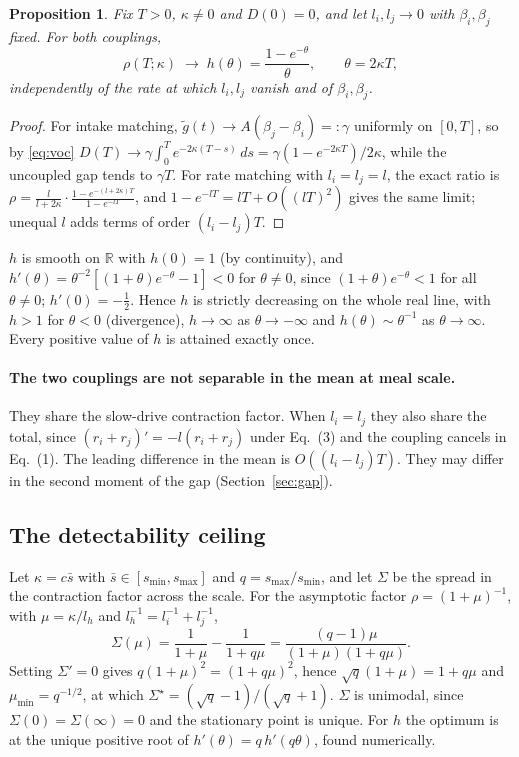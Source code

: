 \documentclass[12pt]{article}
\newtheorem{proposition}{Proposition}[section]
\theoremstyle{definition}
\newcommand{\gt}{\tilde{g}}
\begin{document}
\begin{proposition}\label{prop:flat}
Fix $T>0$, $\kappa\neq0$ and $D(0)=0$, and let $l_i,l_j\to0$ with
$\beta_i,\beta_j$ fixed. For both couplings,
\[
\rho(T;\kappa)\;\longrightarrow\;h(\theta)=\frac{1-e^{-\theta}}{\theta},
\qquad\theta=2\kappa T,
\]
independently of the rate at which $l_i,l_j$ vanish and of $\beta_i,\beta_j$.
\end{proposition}
\begin{proof}
For intake matching, $\gt(t)\to A(\beta_j-\beta_i)=:\gamma$ uniformly on $[0,T]$,
so by \eqref{eq:voc}
$D(T)\to\gamma\int_0^Te^{-2\kappa(T-s)}\,ds=\gamma(1-e^{-2\kappa T})/2\kappa$, while
the uncoupled gap tends to $\gamma T$. For rate matching with $l_i=l_j=l$, the
exact ratio is
$\rho=\frac{l}{l+2\kappa}\cdot\frac{1-e^{-(l+2\kappa)T}}{1-e^{-lT}}$, and
$1-e^{-lT}=lT+O((lT)^2)$ gives the same limit; unequal $l$ adds terms of order
$(l_i-l_j)T$.
\end{proof}

$h$ is smooth on $\mathbb{R}$ with $h(0)=1$ (by continuity), and
$h'(\theta)=\theta^{-2}[(1+\theta)e^{-\theta}-1]<0$ for $\theta\ne0$, since
$(1+\theta)e^{-\theta}<1$ for all $\theta\neq0$; $h'(0)=-\tfrac12$. Hence $h$ is
strictly decreasing on the whole real line, with $h>1$ for $\theta<0$ (divergence),
$h\to\infty$ as $\theta\to-\infty$ and $h(\theta)\sim\theta^{-1}$ as
$\theta\to\infty$. Every positive value of $h$ is attained exactly once.

\paragraph{The two couplings are not separable in the mean at meal scale.} They
share the slow-drive contraction factor. When $l_i=l_j$ they also share the total,
since $(r_i+r_j)'=-l(r_i+r_j)$ under Eq.~(3) and the coupling cancels in Eq.~(1).
The leading difference in the mean is $O((l_i-l_j)T)$. They may differ in the
second moment of the gap (Section~\ref{sec:gap}).

\subsection{The detectability ceiling}

Let $\kappa=c\bar s$ with $\bar s\in[s_{\min},s_{\max}]$ and $q=s_{\max}/s_{\min}$,
and let $\Sigma$ be the spread in the contraction factor across the scale. For the
asymptotic factor $\rho=(1+\mu)^{-1}$, with $\mu=\kappa/l_h$ and
$l_h^{-1}=l_i^{-1}+l_j^{-1}$,
\[
\Sigma(\mu)=\frac{1}{1+\mu}-\frac{1}{1+q\mu}=\frac{(q-1)\mu}{(1+\mu)(1+q\mu)} .
\]
Setting $\Sigma'=0$ gives $q(1+\mu)^2=(1+q\mu)^2$, hence $\sqrt q(1+\mu)=1+q\mu$ and
$\mu_{\min}=q^{-1/2}$, at which $\Sigma^\star=(\sqrt q-1)/(\sqrt q+1)$. $\Sigma$ is
unimodal, since $\Sigma(0)=\Sigma(\infty)=0$ and the stationary point is unique.
For $h$ the optimum is at the unique positive root of $h'(\theta)=q\,h'(q\theta)$,
found numerically.
\end{document}
